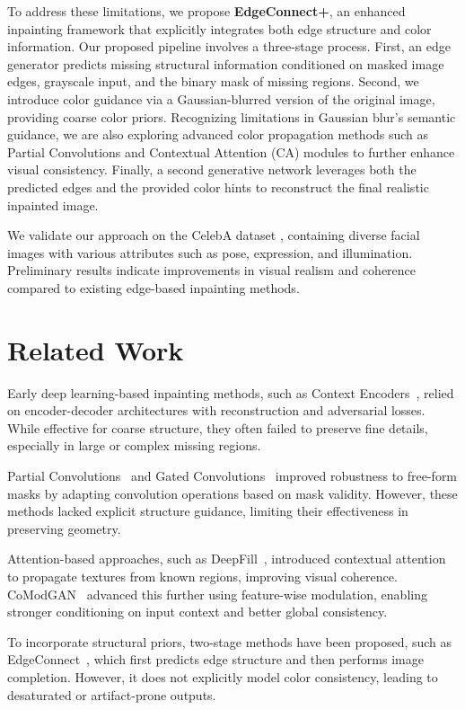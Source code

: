 \documentclass[10pt,twocolumn,letterpaper]{article}
\begin{document}
To address these limitations, we propose \textbf{EdgeConnect+}, an enhanced inpainting framework that explicitly integrates both edge structure and color information. Our proposed pipeline involves a three-stage process. First, an edge generator predicts missing structural information conditioned on masked image edges, grayscale input, and the binary mask of missing regions. Second, we introduce color guidance via a Gaussian-blurred version of the original image, providing coarse color priors. Recognizing limitations in Gaussian blur's semantic guidance, we are also exploring advanced color propagation methods such as Partial Convolutions \cite{liu2018partial} and Contextual Attention (CA) modules \cite{yu2018generative} to further enhance visual consistency. Finally, a second generative network leverages both the predicted edges and the provided color hints to reconstruct the final realistic inpainted image.

We validate our approach on the CelebA dataset \cite{liu2015deep}, containing diverse facial images with various attributes such as pose, expression, and illumination. Preliminary results indicate improvements in visual realism and coherence compared to existing edge-based inpainting methods.

\section{Related Work}

Early deep learning-based inpainting methods, such as Context Encoders~\cite{pathak2016context}, relied on encoder-decoder architectures with reconstruction and adversarial losses. While effective for coarse structure, they often failed to preserve fine details, especially in large or complex missing regions.

Partial Convolutions~\cite{liu2018partial} and Gated Convolutions~\cite{yu2019free} improved robustness to free-form masks by adapting convolution operations based on mask validity. However, these methods lacked explicit structure guidance, limiting their effectiveness in preserving geometry.

Attention-based approaches, such as DeepFill~\cite{yu2018generative}, introduced contextual attention to propagate textures from known regions, improving visual coherence. CoModGAN~\cite{zhao2021comodgan} advanced this further using feature-wise modulation, enabling stronger conditioning on input context and better global consistency.

To incorporate structural priors, two-stage methods have been proposed, such as EdgeConnect~\cite{nazeri2019edgeconnect}, which first predicts edge structure and then performs image completion. However, it does not explicitly model color consistency, leading to desaturated or artifact-prone outputs.
\end{document}
